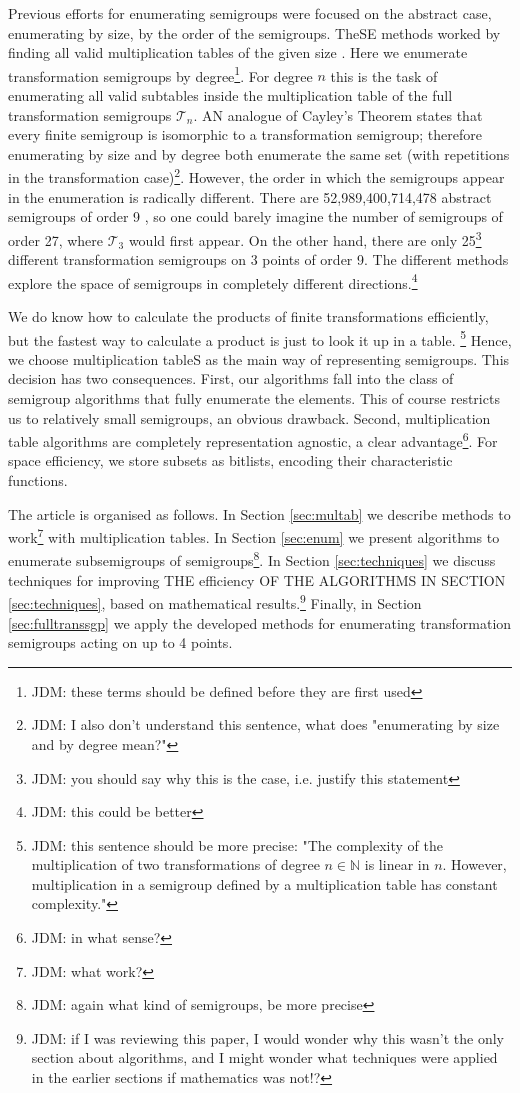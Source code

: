 \documentclass{amsart}
\newcommand{\cT}{{\mathcal T}}
\theoremstyle{plain}
\theoremstyle{definition}
\begin{document}
Previous efforts for enumerating semigroups were focused on the abstract case, enumerating by size, by the order of the semigroups.
TheSE methods worked by finding all valid multiplication tables of the given size \cite{monoidenum2009,For55,JW77,KRS76,Ple67,SZT94,tamura2,tamura1}.
Here we enumerate transformation semigroups by degree\footnote{JDM: these terms
should be defined before they are first used}.
For degree $n$ this is the task of enumerating all valid subtables inside the
multiplication table of the full transformation semigroups $\cT_n$.  AN analogue of Cayley's Theorem states that every finite semigroup is isomorphic to
a transformation semigroup; therefore enumerating by size and by degree both
enumerate the same set (with repetitions in the transformation
case)\footnote{JDM: I also don't understand this sentence, what does
"enumerating by size and by degree mean?"}.
 However,
the order in which the semigroups appear in the enumeration is radically
different.  There are 52,989,400,714,478 abstract semigroups of order 9
\cite{monoidenum2009}, so one could barely imagine the number of semigroups of
order 27, where $\cT_3$ would first appear.  On the other hand, there are only
25\footnote{JDM: you should say why this is the case, i.e. justify this
statement} different transformation semigroups on 3 points of order 9.  The
different methods explore the space of semigroups in completely different
directions.\footnote{JDM: this could be better}


We do know how to calculate the products of finite transformations efficiently,
but the fastest way to calculate a product is just to look it up in a table.
\footnote{JDM: this sentence should be more precise: "The complexity of
  the multiplication of two transformations of degree $n\in\mathbb{N}$ is linear in $n$.
  However, multiplication in a semigroup defined by a multiplication table has
constant complexity."}
Hence, we choose multiplication tableS as the main way of representing semigroups.
This decision has two consequences. 
First, our algorithms fall into the class of semigroup algorithms that fully enumerate the elements.
This of course  restricts us to relatively small semigroups, an obvious drawback.
Second, multiplication table algorithms are completely representation agnostic,
a clear advantage\footnote{JDM: in what sense?}.
For space efficiency, we store subsets as bitlists, encoding their characteristic functions.

The article is organised as follows.
In Section \ref{sec:multab} we describe methods to work\footnote{JDM: what
work?}
with multiplication tables.
In Section \ref{sec:enum} we present algorithms to enumerate subsemigroups of
semigroups\footnote{JDM: again what kind of semigroups, be more precise}.
In Section \ref{sec:techniques} we discuss techniques for improving THE
efficiency OF THE ALGORITHMS IN SECTION \ref{sec:techniques}, based on
mathematical results.\footnote{JDM: if I was reviewing this paper, I would
  wonder why this wasn't the only section about algorithms, and I might wonder
what techniques were applied in the earlier sections if mathematics was not!?}
Finally, in Section \ref{sec:fulltranssgp} we apply the developed methods for enumerating transformation semigroups acting on up to 4 points.
\end{document}
